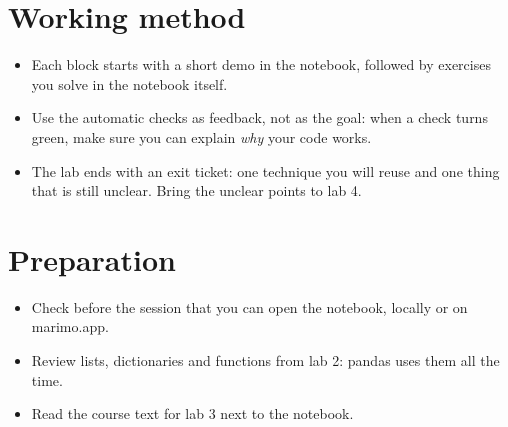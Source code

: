 \documentclass[11pt,a4paper]{article}
\begin{document}


\section{Working method}

\begin{itemize}
  \item Each block starts with a short demo in the notebook, followed by
        exercises you solve in the notebook itself.
  \item Use the automatic checks as feedback, not as the goal: when a
        check turns green, make sure you can explain \emph{why} your code
        works.
  \item The lab ends with an exit ticket: one technique you will reuse
        and one thing that is still unclear. Bring the unclear points to
        lab 4.
\end{itemize}

\section{Preparation}

\begin{itemize}
  \item Check before the session that you can open the notebook, locally
        or on marimo.app.
  \item Review lists, dictionaries and functions from lab 2: pandas uses
        them all the time.
  \item Read the course text for lab 3 next to the notebook.
\end{itemize}
\end{document}
